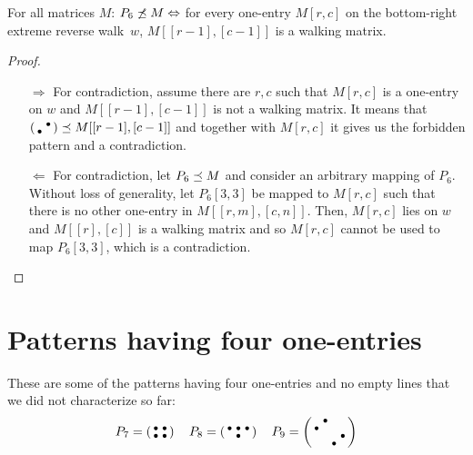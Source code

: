 \begin{prop}
For all matrices $M$: $P_6\not\preceq M\Leftrightarrow$ for every one-entry $M[r,c]$ on the bottom-right extreme reverse walk~$w$, $M[[r-1],[c-1]]$ is a walking matrix.
\end{prop}
\begin{proof}
\begin{itemize}
	\item[$\Rightarrow$] For contradiction, assume there are $r,c$ such that $M[r,c]$ is a one-entry on $w$ and $M[[r-1],[c-1]]$ is not a walking matrix. It means that $\left(\begin{smallmatrix} &\bullet\\\bullet& \end{smallmatrix}\right)\preceq M[[r-1],[c-1]]$ and together with $M[r,c]$ it gives us the forbidden pattern and a contradiction.
	\item[$\Leftarrow$] For contradiction, let $P_6\preceq M$ and consider an arbitrary mapping of $P_6$. Without loss of generality, let $P_6[3,3]$ be mapped to $M[r,c]$ such that there is no other one-entry in $M[[r,m],[c,n]]$. Then, $M[r,c]$ lies on $w$ and $M[[r],[c]]$ is a walking matrix and so $M[r,c]$ cannot be used to map $P_6[3,3]$, which is a contradiction.
\end{itemize}
\end{proof}

\section{Patterns having four one-entries}
\label{sec:4ones}
These are some of the patterns having four one-entries and no empty lines that we did not characterize so far:
$$P_7=\smm{\bullet&\bullet\\\bullet&\bullet}\ \ 
\ P_8=\smm{\bullet&\bullet&\bullet\\ &\bullet& }\ \ 
\ P_9=\smm{ &\bullet& & \\\bullet& & & \\ & & &\bullet\\ & &\bullet& }$$

